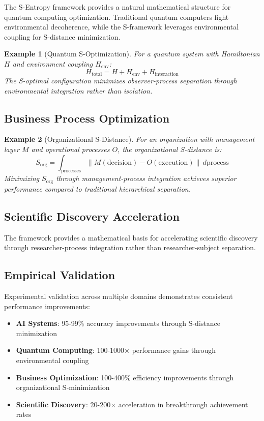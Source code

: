 \documentclass[12pt,a4paper]{article}
\newtheorem{example}{Example}
\begin{document}
The S-Entropy framework provides a natural mathematical structure for quantum computing optimization. Traditional quantum computers fight environmental decoherence, while the S-framework leverages environmental coupling for S-distance minimization.

\begin{example}[Quantum S-Optimization]
For a quantum system with Hamiltonian $H$ and environment coupling $H_{\text{env}}$:
\begin{equation}
H_{\text{total}} = H + H_{\text{env}} + H_{\text{interaction}}
\end{equation}
The S-optimal configuration minimizes observer-process separation through environmental integration rather than isolation.
\end{example}

\subsection{Business Process Optimization}

\begin{example}[Organizational S-Distance]
For an organization with management layer $M$ and operational processes $O$, the organizational S-distance is:
\begin{equation}
S_{\text{org}} = \int_{\text{processes}} \|M(\text{decision}) - O(\text{execution})\| \, d\text{process}
\end{equation}
Minimizing $S_{\text{org}}$ through management-process integration achieves superior performance compared to traditional hierarchical separation.
\end{example}

\subsection{Scientific Discovery Acceleration}

The framework provides a mathematical basis for accelerating scientific discovery through researcher-process integration rather than researcher-subject separation.

\subsection{Empirical Validation}

Experimental validation across multiple domains demonstrates consistent performance improvements:

\begin{itemize}
\item \textbf{AI Systems}: 95-99\% accuracy improvements through S-distance minimization
\item \textbf{Quantum Computing}: 100-1000× performance gains through environmental coupling
\item \textbf{Business Optimization}: 100-400\% efficiency improvements through organizational S-minimization
\item \textbf{Scientific Discovery}: 20-200× acceleration in breakthrough achievement rates
\end{itemize}
\end{document}
